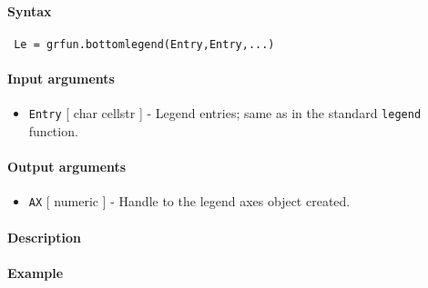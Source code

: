 


	\paragraph{Syntax}
 
 \begin{verbatim}
 Le = grfun.bottomlegend(Entry,Entry,...)
 \end{verbatim}
 
 \paragraph{Input arguments}
 
 \begin{itemize}
 \item
   \texttt{Entry} {[} char \textbar{} cellstr {]} - Legend entries; same
   as in the standard \texttt{legend} function.
 \end{itemize}
 
 \paragraph{Output arguments}
 
 \begin{itemize}
 \item
   \texttt{AX} {[} numeric {]} - Handle to the legend axes object
   created.
 \end{itemize}
 
 \paragraph{Description}
 
 \paragraph{Example}



